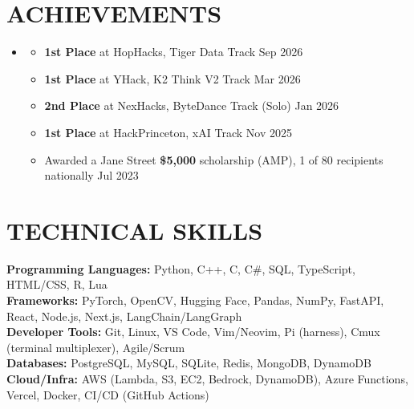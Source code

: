 \documentclass[letterpaper,11pt]{article}
\newcommand{\resumeItem}[1]{
  \item\small{
    {#1 \vspace{-4pt}}
  }
}
\newcommand{\resumeSubHeadingListStart}{\begin{itemize}[leftmargin=0.15in, label={}]}
\newcommand{\resumeSubHeadingListEnd}{\end{itemize}}
\newcommand{\resumeItemListStart}{\begin{itemize}[itemsep=4.5pt]}
\newcommand{\resumeItemListEnd}{\end{itemize}\vspace{-6pt}}
\begin{document}
\section{\textbf{ACHIEVEMENTS}}
  \resumeSubHeadingListStart
    \item
      \resumeItemListStart
        \resumeItem{\textbf{1st Place} at HopHacks, Tiger Data Track \hfill Sep 2026}
        \resumeItem{\textbf{1st Place} at YHack, K2 Think V2 Track \hfill Mar 2026}
        \resumeItem{\textbf{2nd Place} at NexHacks, ByteDance Track (Solo) \hfill Jan 2026}
        \resumeItem{\textbf{1st Place} at HackPrinceton, xAI Track \hfill Nov 2025}
        \resumeItem{Awarded a Jane Street \textbf{\$5,000} scholarship (AMP), 1 of 80 recipients nationally \hfill Jul 2023}
      \resumeItemListEnd
  \resumeSubHeadingListEnd

\section{\textbf{TECHNICAL SKILLS}}
 \begin{itemize}[leftmargin=0.15in, label={}, itemsep=-3pt, topsep=0pt]
    \small{\item{
     \textbf{Programming Languages:}{ Python, C++, C, C\#, SQL, TypeScript, HTML/CSS, R, Lua} \\
     \textbf{Frameworks:}{ PyTorch, OpenCV, Hugging Face, Pandas, NumPy, FastAPI, React, Node.js, Next.js, LangChain/LangGraph} \\
     \textbf{Developer Tools:}{ Git, Linux, VS Code, Vim/Neovim, Pi (harness), Cmux (terminal multiplexer), Agile/Scrum} \\
     \textbf{Databases:}{ PostgreSQL, MySQL, SQLite, Redis, MongoDB, DynamoDB} \\
     \textbf{Cloud/Infra:}{ AWS (Lambda, S3, EC2, Bedrock, DynamoDB), Azure Functions, Vercel, Docker, CI/CD (GitHub Actions)}
    }}
 \end{itemize}

\end{document}
